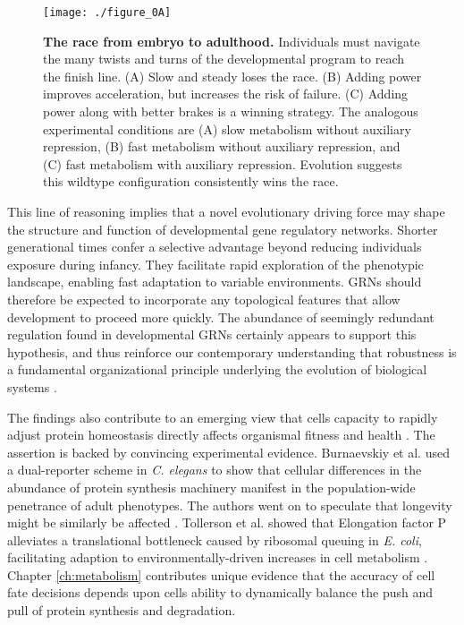 \begin{figure}[h!]
\centering
\texttt{[image: ./figure\_0A]}
\caption[The race from embryo to adulthood.]{\textbf{The race from embryo to adulthood.} Individuals must navigate the many twists and turns of the developmental program to reach the finish line. (A) Slow and steady loses the race. (B) Adding power improves acceleration, but increases the risk of failure. (C) Adding power along with better brakes is a winning strategy. The analogous experimental conditions are (A) slow metabolism without auxiliary repression, (B) fast metabolism without auxiliary repression, and (C) fast metabolism with auxiliary repression. Evolution suggests this wildtype configuration consistently wins the race.}
\label{fig:conc:fig0}
\end{figure}

This line of reasoning implies that a novel evolutionary driving force may shape the structure and function of developmental gene regulatory networks. Shorter generational times confer a selective advantage beyond reducing individuals exposure during infancy. They facilitate rapid exploration of the phenotypic landscape, enabling fast adaptation to variable environments. GRNs should therefore be expected to incorporate any topological features that allow development to proceed more quickly. The abundance of seemingly redundant regulation found in developmental GRNs certainly appears to support this hypothesis, and thus reinforce our contemporary understanding that robustness is a fundamental organizational principle underlying the evolution of biological systems \cite{Kitano2004,Stelling2004}. 

The findings also contribute to an emerging view that cells capacity to rapidly adjust protein homeostasis directly affects organismal fitness and health \cite{Visscher2016,Tollerson2018,Burnaevskiy2018}. The assertion is backed by convincing experimental evidence. Burnaevskiy et al. used a dual-reporter scheme in \textit{C. elegans} to show that cellular differences in the abundance of protein synthesis machinery manifest in the population-wide penetrance of adult phenotypes. The authors went on to speculate that longevity might be similarly be affected \cite{Burnaevskiy2018}. Tollerson et al. showed that Elongation factor P alleviates a translational bottleneck caused by ribosomal queuing in \textit{E. coli}, facilitating adaption to environmentally-driven increases in cell metabolism \cite{Tollerson2018}. Chapter \ref{ch:metabolism} contributes unique evidence that the accuracy of cell fate decisions depends upon cells ability to dynamically balance the push and pull of protein synthesis and degradation. 

